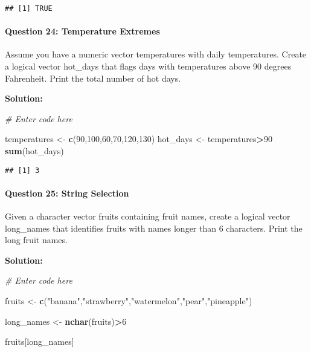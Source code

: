 \documentclass[
]{article}
\newenvironment{Shaded}{\begin{snugshade}}{\end{snugshade}}
\newcommand{\CommentTok}[1]{\textcolor[rgb]{0.56,0.35,0.01}{\textit{#1}}}
\newcommand{\DecValTok}[1]{\textcolor[rgb]{0.00,0.00,0.81}{#1}}
\newcommand{\FunctionTok}[1]{\textcolor[rgb]{0.13,0.29,0.53}{\textbf{#1}}}
\newcommand{\NormalTok}[1]{#1}
\newcommand{\OtherTok}[1]{\textcolor[rgb]{0.56,0.35,0.01}{#1}}
\newcommand{\SpecialCharTok}[1]{\textcolor[rgb]{0.81,0.36,0.00}{\textbf{#1}}}
\newcommand{\StringTok}[1]{\textcolor[rgb]{0.31,0.60,0.02}{#1}}
\begin{document}
\begin{verbatim}
## [1] TRUE
\end{verbatim}

\hypertarget{question-24-temperature-extremes}{%
\paragraph{Question 24: Temperature
Extremes}\label{question-24-temperature-extremes}}

Assume you have a numeric vector temperatures with daily temperatures.
Create a logical vector hot\_days that flags days with temperatures
above 90 degrees Fahrenheit. Print the total number of hot days.

\textbf{Solution:}

\begin{Shaded}
\begin{Highlighting}[]
\CommentTok{\# Enter code here}

\NormalTok{temperatures }\OtherTok{\textless{}{-}} \FunctionTok{c}\NormalTok{(}\DecValTok{90}\NormalTok{,}\DecValTok{100}\NormalTok{,}\DecValTok{60}\NormalTok{,}\DecValTok{70}\NormalTok{,}\DecValTok{120}\NormalTok{,}\DecValTok{130}\NormalTok{)}
\NormalTok{hot\_days }\OtherTok{\textless{}{-}}\NormalTok{ temperatures}\SpecialCharTok{\textgreater{}}\DecValTok{90}
\FunctionTok{sum}\NormalTok{(hot\_days)}
\end{Highlighting}
\end{Shaded}

\begin{verbatim}
## [1] 3
\end{verbatim}

\hypertarget{question-25-string-selection}{%
\paragraph{Question 25: String
Selection}\label{question-25-string-selection}}

Given a character vector fruits containing fruit names, create a logical
vector long\_names that identifies fruits with names longer than 6
characters. Print the long fruit names.

\textbf{Solution:}

\begin{Shaded}
\begin{Highlighting}[]
\CommentTok{\# Enter code here}

\NormalTok{fruits }\OtherTok{\textless{}{-}} \FunctionTok{c}\NormalTok{(}\StringTok{"banana"}\NormalTok{,}\StringTok{"strawberry"}\NormalTok{,}\StringTok{"watermelon"}\NormalTok{,}\StringTok{"pear"}\NormalTok{,}\StringTok{"pineapple"}\NormalTok{)}

\NormalTok{long\_names }\OtherTok{\textless{}{-}} \FunctionTok{nchar}\NormalTok{(fruits)}\SpecialCharTok{\textgreater{}}\DecValTok{6}

\NormalTok{fruits[long\_names]}
\end{Highlighting}
\end{Shaded}
\end{document}
